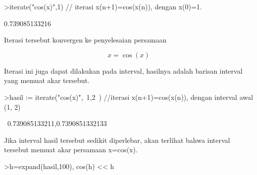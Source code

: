 \documentclass[12pt,Times new roman,letterpaper]{book}
\begin{document}
\begin{eulernootebook}
\begin{eulercomment}
\begin{eulercomment}
\begin{eulernootebook}
\begin{eulercomment}
\begin{eulercomment}
\begin{eulercomment}
\begin{eulercomment}
\begin{eulercomment}
\begin{eulercomment}
\begin{eulernotebook}
\begin{eulercomment}
\begin{eulercomment}
\begin{eulercomment}
\begin{eulercomment}
\begin{eulercomment}
\begin{eulercomment}
\begin{eulercomment}
\begin{eulercomment}
\begin{eulercomment}
\begin{eulercomment}
\begin{eulercomment}
\begin{eulercomment}
\begin{eulercomment}
\begin{eulercomment}
\begin{eulercomment}
\begin{eulercomment}
\begin{eulercomment}
\begin{eulercomment}
\begin{eulercomment}
\begin{eulercomment}
\begin{eulercomment}
\begin{eulercomment}
\begin{eulercomment}
\begin{eulercomment}
\begin{eulercomment}
\begin{eulercomment}
\begin{eulercomment}
\begin{eulercomment}
\begin{eulercomment}
\begin{eulercomment}
\begin{eulercomment}
\end{eulercomment}
\begin{eulerprompt}
>iterate("cos(x)",1) // iterasi x(n+1)=cos(x(n)), dengan x(0)=1.
\end{eulerprompt}
\begin{euleroutput}
  0.739085133216
\end{euleroutput}
\begin{eulercomment}
Iterasi tersebut konvergen ke penyelesaian persamaan

\end{eulercomment}
\begin{eulerformula}
\[
x = \cos(x)
\]
\end{eulerformula}
\begin{eulercomment}
Iterasi ini juga dapat dilakukan pada interval, hasilnya adalah
barisan interval yang memuat akar tersebut.
\end{eulercomment}
\begin{eulerprompt}
>hasil := iterate("cos(x)",~1,2~) //iterasi x(n+1)=cos(x(n)), dengan interval awal (1, 2)
\end{eulerprompt}
\begin{euleroutput}
  ~0.739085133211,0.7390851332133~
\end{euleroutput}
\begin{eulercomment}
Jika interval hasil tersebut sedikit diperlebar, akan terlihat bahwa
interval tersebut memuat akar persamaan x=cos(x).
\end{eulercomment}
\begin{eulerprompt}
>h=expand(hasil,100), cos(h) << h
\end{eulerprompt}

\end{eulercomment}
\end{eulercomment}
\end{eulercomment}
\end{eulercomment}
\end{eulercomment}
\end{eulercomment}
\end{eulercomment}
\end{eulercomment}
\end{eulercomment}
\end{eulercomment}
\end{eulercomment}
\end{eulercomment}
\end{eulercomment}
\end{eulercomment}
\end{eulercomment}
\end{eulercomment}
\end{eulercomment}
\end{eulercomment}
\end{eulercomment}
\end{eulercomment}
\end{eulercomment}
\end{eulercomment}
\end{eulercomment}
\end{eulercomment}
\end{eulercomment}
\end{eulercomment}
\end{eulercomment}
\end{eulercomment}
\end{eulercomment}
\end{eulercomment}
\end{eulernotebook}
\end{eulercomment}
\end{eulercomment}
\end{eulercomment}
\end{eulercomment}
\end{eulercomment}
\end{eulercomment}
\end{eulernootebook}
\end{eulercomment}
\end{eulercomment}
\end{eulernootebook}
\end{document}
